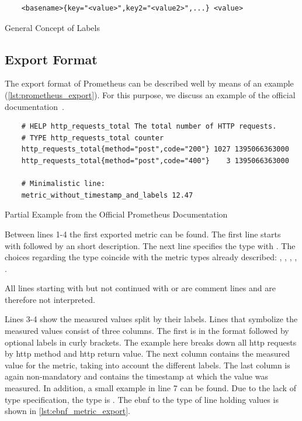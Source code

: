 \begin{listing}[!ht]
	\begin{verbatim}
	<basename>{key="<value>",key2="<value2>",...} <value>
	\end{verbatim}
	\caption{General Concept of Labels}
	\label{lst:concept_label}
\end{listing}

\subsection{Export Format}
\label{subsec:Exportformat}

The export format of Prometheus can be described well by means of an example (\cref{lst:prometheus_export}). For this purpose, we discuss an example of the official documentation~\cite{PrometheusExpositionFormatBeispiel}.

\begin{listing}[!ht]
	\begin{verbatim}
	# HELP http_requests_total The total number of HTTP requests.
	# TYPE http_requests_total counter
	http_requests_total{method="post",code="200"} 1027 1395066363000
	http_requests_total{method="post",code="400"}    3 1395066363000
	
	# Minimalistic line:
	metric_without_timestamp_and_labels 12.47
	\end{verbatim}
	\caption[Partial Example from the Official Prometheus Documentation]{Partial Example from the Official Prometheus Documentation~\cite{PrometheusExpositionFormatBeispiel}}
	\label{lst:prometheus_export}
\end{listing}

Between lines 1-4 the first exported metric can be found. The first line starts with  followed by an short description. The next line specifies the type with . The choices regarding the type coincide with the metric types already described: , , , , .

All lines starting with \promcode{#} but not continued with  or  are comment lines and are therefore not interpreted.

Lines 3-4 show the measured values split by their labels. Lines that symbolize the measured values consist of three columns. The first is in the format  followed by optional labels in curly brackets. The example here breaks down all \gls{http} requests by \gls{http} method and \gls{http} return value. The next column contains the measured value for the metric, taking into account the different labels. The last column is again non-mandatory and contains the timestamp at which the value was measured. 
In addition, a small example in line 7 can be found. Due to the lack of type specification, the type is . The \gls{ebnf} to the type of line holding values is shown in \cref{lst:ebnf_metric_export}.

